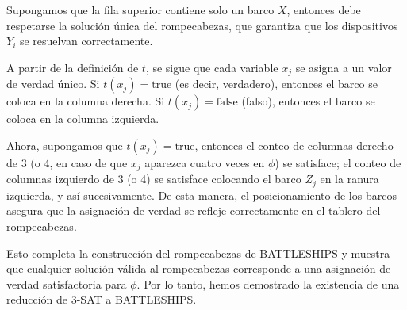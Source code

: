 \documentclass{article}
\begin{document}
Supongamos que la fila superior contiene solo un barco $X$, entonces debe respetarse la solución única del rompecabezas, que garantiza que los dispositivos $Y_i$ se resuelvan correctamente.

A partir de la definición de $t$, se sigue que cada variable $x_j$ se asigna a un valor de verdad único. Si $t(x_j) = \text{true}$ (es decir, verdadero), entonces el barco se coloca en la columna derecha. Si $t(x_j) = \text{false}$ (falso), entonces el barco se coloca en la columna izquierda.

Ahora, supongamos que $t(x_j) = \text{true}$, entonces el conteo de columnas derecho de 3 (o 4, en caso de que $x_j$ aparezca cuatro veces en $\phi$) se satisface; el conteo de columnas izquierdo de 3 (o 4) se satisface colocando el barco $Z_j$ en la ranura izquierda, y así sucesivamente. De esta manera, el posicionamiento de los barcos asegura que la asignación de verdad se refleje correctamente en el tablero del rompecabezas.

Esto completa la construcción del rompecabezas de BATTLESHIPS y muestra que cualquier solución válida al rompecabezas corresponde a una asignación de verdad satisfactoria para $\phi$. Por lo tanto, hemos demostrado la existencia de una reducción  de 3-SAT a BATTLESHIPS.
\end{document}

